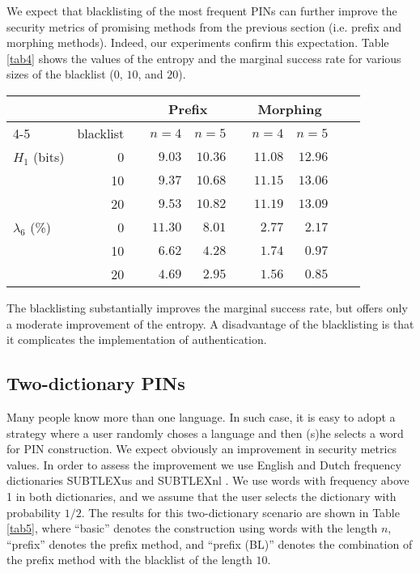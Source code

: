 \documentclass[a4paper, 11pt]{article}
\newcommand{\ra}[1]{\renewcommand{\arraystretch}{#1}}
\begin{document}
We expect that blacklisting of the most frequent PINs can further improve the security metrics 
of promising methods from the previous section (i.e. prefix and morphing methods). Indeed, our 
experiments confirm this expectation. Table \ref{tab4} shows the values of the entropy and the
marginal success rate for various sizes of the blacklist ($0$, $10$, and $20$). 

\begin{table*}[h]\centering
\ra{1.2}
\begin{tabular}{@{}lrrrrrrrrr@{}}\toprule
 &&& \multicolumn{2}{c}{Prefix} &\phantom{a} & \multicolumn{2}{c}{Morphing} \\
   \cmidrule{4-5} \cmidrule{7-8}
 & blacklist &\phantom{a} & $n=4$ & $n=5$ && $n=4$ & $n=5$ \\ 
\midrule
$H_1$ (bits) 
  & 0 && $9.03$ & $10.36$ && $11.08$ & $12.96$ \\
  &10 && $9.37$ & $10.68$ && $11.15$ & $13.06$ \\
  &20 && $9.53$ & $10.82$ && $11.19$ & $13.09$ \\
\midrule
$\lambda_{6}$ (\%) 
  &0  && $11.30$ & $8.01$ && $2.77$ & $2.17$ \\
  &10 && $6.62$ & $4.28$ && $1.74$ & $0.97$ \\
  &20 && $4.69$ & $2.95$ && $1.56$ & $0.85$ \\
\bottomrule
\end{tabular}
\caption{Combination of PIN blacklist and the prefix/morphing method}\label{tab4}
\end{table*}

The blacklisting substantially improves the marginal success rate, but offers only a moderate
improvement of the entropy. A disadvantage of the blacklisting is that it complicates the
implementation of authentication.

\subsection{Two-dictionary PINs}

Many people know more than one language. In such case, it is easy to adopt a strategy where a user
randomly choses a language and then (s)he selects a word for PIN construction. We expect obviously
an improvement in security metrics values. In order to assess the improvement we use English 
and Dutch frequency dictionaries SUBTLEXus and SUBTLEXnl \cite{SUBTLEXnl}. We use words with
frequency above 1 in both dictionaries, and we assume that the user selects the dictionary with
probability $1/2$. The results for this two-dictionary scenario are shown 
in Table \ref{tab5}, where ``basic'' denotes the construction using words with the length $n$, 
``prefix'' denotes the prefix method, and ``prefix (BL)'' denotes the combination of the prefix 
method with the blacklist of the length $10$.
\end{document}

